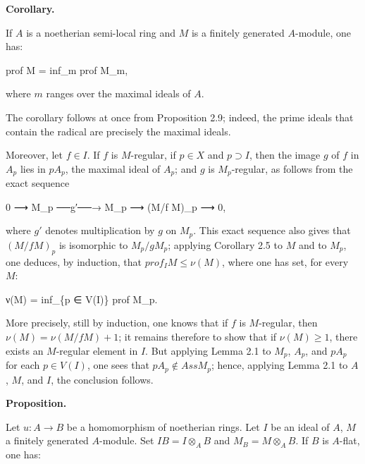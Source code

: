 \documentclass[
]{article}
\newenvironment{Shaded}{}{}
\newcommand{\NormalTok}[1]{#1}
\begin{document}
\textbf{Corollary.}

If \(A\) is a noetherian semi-local ring and \(M\) is a finitely
generated \(A\)-module, one has:

\begin{Shaded}
\begin{Highlighting}[]
\NormalTok{prof M = inf\_m prof M\_m,}
\end{Highlighting}
\end{Shaded}

where \(m\) ranges over the maximal ideals of \(A\).

The corollary follows at once from Proposition 2.9; indeed, the prime
ideals that contain the radical are precisely the maximal ideals.

Moreover, let \(f \in I\). If \(f\) is \(M\)-regular, if \(p \in X\) and
\(p \supset I\), then the image \(g\) of \(f\) in \(A_{p}\) lies in
\(pA_{p}\), the maximal ideal of \(A_{p}\); and \(g\) is
\(M_{p}\)-regular, as follows from the exact sequence

\begin{Shaded}
\begin{Highlighting}[]
\NormalTok{0 ⟶ M\_p ──g′──→ M\_p ⟶ (M/f M)\_p ⟶ 0,}
\end{Highlighting}
\end{Shaded}

where \(g'\) denotes multiplication by \(g\) on \(M_{p}\). This exact
sequence also gives that \((M/f M)_{p}\) is isomorphic to
\(M_{p}/gM_{p}\); applying Corollary 2.5 to \(M\) and to \(M_{p}\), one
deduces, by induction, that \(prof_{I} M \leqslant \nu(M)\), where one
has set, for every \(M\):

\begin{Shaded}
\begin{Highlighting}[]
\NormalTok{ν(M) = inf\_\{p ∈ V(I)\} prof M\_p.}
\end{Highlighting}
\end{Shaded}

More precisely, still by induction, one knows that if \(f\) is
\(M\)-regular, then \(\nu(M) = \nu(M/f M) + 1\); it remains therefore to
show that if \(\nu(M) \geqslant 1\), there exists an \(M\)-regular
element in \(I\). But applying Lemma 2.1 to \(M_{p}\), \(A_{p}\), and
\(pA_{p}\) for each \(p \in V(I)\), one sees that
\(pA_{p} \notin Ass M_{p}\); hence, applying Lemma 2.1 to \(A\), \(M\),
and \(I\), the conclusion follows.

\textbf{Proposition.}

Let \(u: A \to B\) be a homomorphism of noetherian rings. Let \(I\) be
an ideal of \(A\), \(M\) a finitely generated \(A\)-module. Set
\(IB = I \otimes_{A} B\) and \(M_{B} = M \otimes_{A} B\). If \(B\) is
\(A\)-flat, one has:
\end{document}
